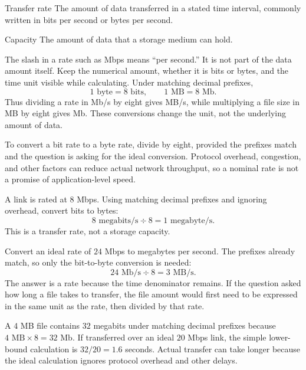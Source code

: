 \begin{definitionbox}{Transfer rate}
The amount of data transferred in a stated time interval, commonly written
in bits per second or bytes per second.
\end{definitionbox}

\begin{definitionbox}{Capacity}
The amount of data that a storage medium can hold.
\end{definitionbox}

The slash in a rate such as Mbps means ``per second.'' It is not part of the
data amount itself. Keep the numerical amount, whether it is bits or bytes,
and the time unit visible while calculating. Under matching decimal prefixes,
\[
  1\text{ byte}=8\text{ bits},\qquad
  1\text{ MB}=8\text{ Mb}.
\]
Thus dividing a rate in Mb/s by eight gives MB/s, while multiplying a file
size in MB by eight gives Mb. These conversions change the unit, not the
underlying amount of data.

To convert a bit rate to a byte rate, divide by eight, provided the prefixes
match and the question is asking for the ideal conversion. Protocol overhead,
congestion, and other factors can reduce actual network throughput, so a
nominal rate is not a promise of application-level speed.

\begin{example}
A link is rated at $8$ Mbps. Using matching decimal prefixes and ignoring
overhead, convert bits to bytes:
\[
8\text{ megabits/s}\div 8=1\text{ megabyte/s}.
\]
This is a transfer rate, not a storage capacity.
\end{example}

\begin{example}
Convert an ideal rate of $24$ Mbps to megabytes per second. The prefixes
already match, so only the bit-to-byte conversion is needed:
\[
  24\text{ Mb/s}\div 8=3\text{ MB/s}.
\]
The answer is a rate because the time denominator remains. If the question
asked how long a file takes to transfer, the file amount would first need to
be expressed in the same unit as the rate, then divided by that rate.
\end{example}

\begin{example}
A $4$ MB file contains $32$ megabits under matching decimal prefixes because
$4\text{ MB}\times 8=32\text{ Mb}$. If transferred over an ideal $20$ Mbps
link, the simple lower-bound calculation is $32/20=1.6$ seconds. Actual
transfer can take longer because the ideal calculation ignores protocol
overhead and other delays.
\end{example}

